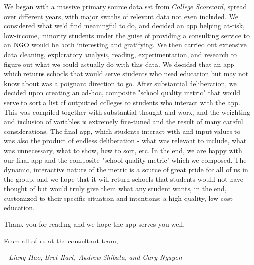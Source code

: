 \documentclass{article}\usepackage[]{graphicx}\usepackage[]{color}
\begin{document}
We began with a massive primary source data set from \emph{College Scorecard}, spread over different years, with major swaths of relevant data not even included. We considered what we'd find meaningful to do, and decided an app helping at-risk, low-income, minority students under the guise of providing a consulting service to an NGO would be both interesting and gratifying. We then carried out extensive data cleaning, exploratory analysis, reading, experimentation, and research to figure out what we could actually do with this data. We decided that an app which returns schools that would serve students who need education but  may not know about was a poignant direction to go. After substantial deliberation, we decided upon creating an ad-hoc, composite "school quality metric" that would serve to sort a list of outputted colleges to students who interact with the app. This was compiled together with substantial thought and work, and the weighting and inclusion of variables is extremely fine-tuned and the result of many careful considerations. The final app, which students interact with and input values to was also the product of endless deliberation - what was relevant to include, what was unnecessary, what to show, how to sort, etc. In the end, we are happy with our final app and the composite "school quality metric" which we composed. The dynamic, interactive nature of the metric is a source of great pride for all of us in the group, and we hope that it will return schools that students would not have thought of but would truly give them what any student wants, in the end, customized to their specific situation and intentions: a high-quality, low-cost education.\newline

Thank you for reading and we hope the app serves you well.\newline

From all of us at the consultant team,

\textit{- Liang Hao, Bret Hart, Andrew Shibata, and Gary Nguyen}
\end{document}
